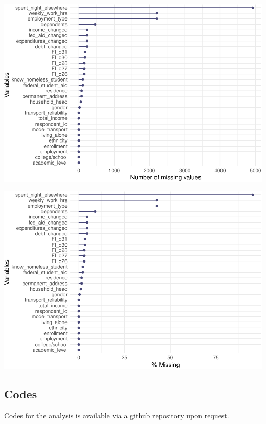 \documentclass[
  10pt,
]{article}
\begin{document}
\begin{center}\includegraphics{final_phase2_report_files/figure-latex/unnamed-chunk-33-2} \end{center}

\begin{center}\includegraphics{final_phase2_report_files/figure-latex/unnamed-chunk-33-3} \end{center}

\hypertarget{codes}{%
\subsection{Codes}\label{codes}}

Codes for the analysis is available via a github repository upon request.

\newpage{}
\end{document}
